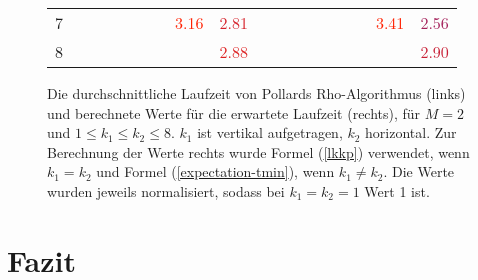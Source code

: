\documentclass[a4paper, 10pt, ngerman]{article}
\begin{document}
\begin{figure}
\begin{tabular}{c|p{\colwidth}p{\colwidth}p{\colwidth}p{\colwidth}p{\colwidth}p{\colwidth}p{\colwidth}p{\colwidth}c|p{\colwidth}p{\colwidth}p{\colwidth}p{\colwidth}p{\colwidth}p{\colwidth}p{\colwidth}p{\colwidth}}
            7 &                                    &                                    &                                    &                                    &                                    &                                    & \textcolor[HTML]{ ff2000 }{ 3.16 } & \textcolor[HTML]{ d52029 }{ 2.81 } & \space &                                    &                                    &                                    &                                    &                                    &                                    & \textcolor[HTML]{ ff2000 }{ 3.41 } & \textcolor[HTML]{ a4205a }{ 2.56 } \\
            8 &                                    &                                    &                                    &                                    &                                    &                                    &                                    & \textcolor[HTML]{ dd2021 }{ 2.88 } & \space &                                    &                                    &                                    &                                    &                                    &                                    &                                    & \textcolor[HTML]{ c82036 }{ 2.90 } \\
        \end{tabular}

        \caption{Die durchschnittliche Laufzeit von Pollards Rho-Algorithmus (links) und berechnete Werte für die erwartete Laufzeit (rechts), für $M = 2$ und $1 \le k_1 \le k_2 \le 8$. $k_1$ ist vertikal aufgetragen, $k_2$ horizontal. Zur Berechnung der Werte rechts wurde Formel (\ref{lkkp}) verwendet, wenn $k_1 = k_2$ und Formel (\ref{expectation-tmin}), wenn $k_1 \ne k_2$. Die Werte wurden jeweils normalisiert, sodass bei $k_1 = k_2 = 1$ Wert 1 ist.}
        \label{fig:measurements-m2}
    \end{figure}

    \section{Fazit}
\end{document}
